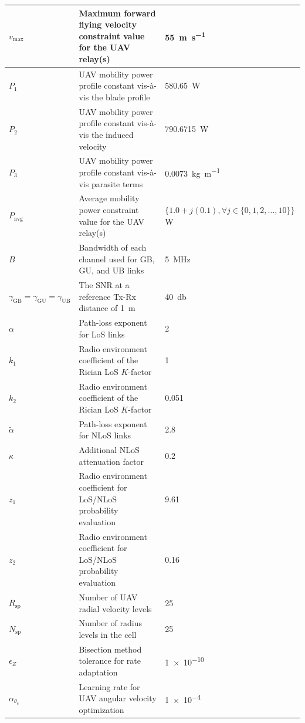 \documentclass[12pt, draftcls, onecolumn]{IEEEtran}
\theoremstyle{plain}
\theoremstyle{definition}
\theoremstyle{remark}
\begin{document}
\begin{table}
\begin{tabular}{|p{2cm}|p{8cm}|p{5.2cm}|}
    \hline
    $v_{\text{max}}$ & Maximum forward flying velocity constraint value for the UAV relay(s) & \qty[mode=text]{55}{\meter\per\second}\\
    \hline
    $P_{1}$ & UAV mobility power profile constant vis-à-vis the blade profile & \qty[mode=text]{580.65}{\watt}\\
    \hline
    $P_{2}$ & UAV mobility power profile constant vis-à-vis the induced velocity & \qty[mode=text]{790.6715}{\watt}\\
    \hline
    $P_{3}$ & UAV mobility power profile constant vis-à-vis parasite terms & \qty[mode=text]{0.0073}{\kilogram\per\meter}\\
    \hline
    $P_{\text{avg}}$ & Average mobility power constraint value for the UAV relay(s) & $\{1.0{+}j(0.1),{\forall}j{\in}\{0,1,2,\dots,10\}\}$ \unit{\watt}\\
    \hline
    $B$ & Bandwidth of each channel used for GB, GU, and UB links & \qty[mode=text]{5}{\mega\hertz}\\
    \hline
    $\gamma_{\text{GB}}{=}\gamma_{\text{GU}}{=}\gamma_{\text{UB}}$ & The SNR at a reference Tx-Rx distance of \qty[mode=text]{1}{\meter} & \qty[mode=text]{40}{\decibel}\\
    \hline
    $\alpha$ & Path-loss exponent for LoS links & \num{2}\\
    \hline
    $k_{1}$ & Radio environment coefficient of the Rician LoS $K$-factor & \num{1}\\
    \hline
    $k_{2}$ & Radio environment coefficient of the Rician LoS $K$-factor & \num{0.051}\\
    \hline
    $\tilde{\alpha}$ & Path-loss exponent for NLoS links & \num{2.8}\\
    \hline
    $\kappa$ & Additional NLoS attenuation factor & \num{0.2}\\
    \hline
    $z_{1}$ & Radio environment coefficient for LoS/NLoS probability evaluation & \num{9.61}\\
    \hline
    $z_{2}$ & Radio environment coefficient for LoS/NLoS probability evaluation & \num{0.16}\\
    \hline
    $R_{\text{sp}}$ & Number of UAV radial velocity levels & \num{25}\\
    \hline
    $N_{\text{sp}}$ & Number of radius levels in the cell & \num{25}\\
    \hline
    $\epsilon_{Z}$ & Bisection method tolerance for rate adaptation & \num{1e-10}\\
    \hline
    $\alpha_{\theta_{c}}$ & Learning rate for UAV angular velocity optimization & \num{1e-4}\\

\end{tabular}
\end{table}
\end{document}
